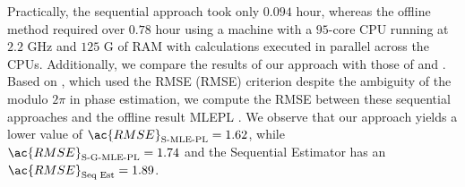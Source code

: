     Practically, the sequential approach took only $0.094$ hour, whereas the offline method required over $0.78$ hour using a machine with a $95$-core CPU running at $2.2$ GHz and $125$ G of RAM with calculations executed in parallel across the CPUs. Additionally, we compare the results of our approach with those of \citep{elhajjar2024} and  \citep{ansari2017sequential}. 
    Based on \citep{ansari2017sequential}, which used the \acl{RMSE} (\acs{RMSE}) criterion despite the ambiguity of the modulo $2 \pi$ in phase estimation, we compute the \acs{RMSE} between these sequential approaches and the offline result \ac{MLEPL} \citep{vu2023robust}. We observe that our approach yields a lower value of $\ac{RMSE}_{\scriptsize \text{S-MLE-PL}} = 1.62$, while $\ac{RMSE}_{\scriptsize \text{S-G-MLE-PL}} = 1.74$  and the Sequential Estimator \citep{ansari2017sequential} has an $\ac{RMSE}_{\scriptsize \text{Seq~Est}} = 1.89$.
    
